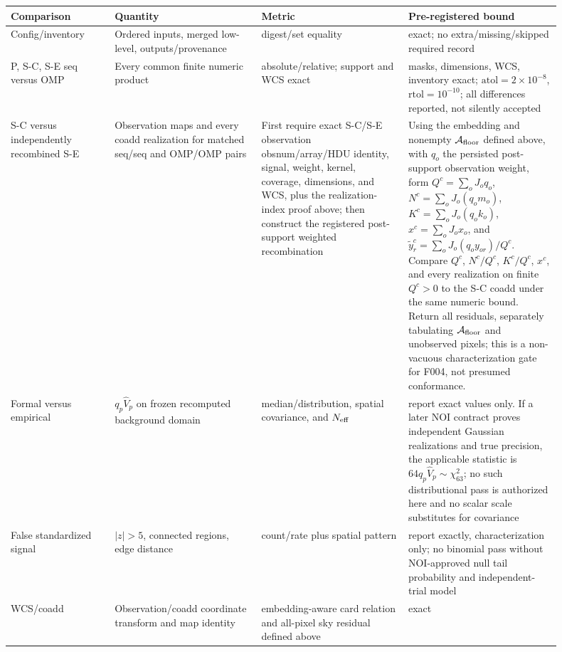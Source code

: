 \documentclass[11pt]{article}
\begin{document}
\begin{longtable}{L{0.17\linewidth}L{0.24\linewidth}L{0.24\linewidth}L{0.25\linewidth}}
\toprule
Comparison & Quantity & Metric & Pre-registered bound\\
\midrule
Config/inventory & Ordered inputs, merged low-level, outputs/provenance &
digest/set equality & exact; no extra/missing/skipped required record\\
P, S-C, S-E seq versus OMP & Every common finite numeric product &
absolute/relative; support and WCS exact & masks, dimensions, WCS, inventory
exact;
\(\mathrm{atol}=2\times10^{-8}\), \(\mathrm{rtol}=10^{-10}\); all differences
reported, not silently accepted\\
S-C versus independently recombined S-E & Observation maps and every coadd
realization for matched seq/seq and OMP/OMP pairs & First require exact
S-C/S-E observation obsnum/array/HDU identity, signal, weight, kernel,
coverage, dimensions, and WCS, plus the realization-index proof above; then
construct the registered post-support weighted recombination & Using the
embedding and nonempty \(\mathcal A_{\rm floor}\) defined above, with
\(q_o\) the persisted post-support observation weight, form
\(Q^c=\sum_oJ_oq_o\), \(N^c=\sum_oJ_o(q_om_o)\),
\(K^c=\sum_oJ_o(q_ok_o)\), \(x^c=\sum_oJ_ox_o\), and
\(\widetilde y_r^c=\sum_oJ_o(q_oy_{or})/Q^c\).  Compare \(Q^c\),
\(N^c/Q^c\), \(K^c/Q^c\), \(x^c\), and every realization on finite
\(Q^c>0\) to the S-C coadd under the same numeric bound.  Return all residuals,
separately tabulating \(\mathcal A_{\rm floor}\) and unobserved pixels; this is a
non-vacuous characterization gate for F004, not presumed conformance.\\
Formal versus empirical & \(q_p\widehat V_p\) on frozen recomputed background
domain & median/distribution, spatial covariance, and \(N_{\rm eff}\) & report
exact values only.  If a later NOI contract proves independent Gaussian
realizations and true precision, the applicable statistic is
\(64q_p\widehat V_p\sim\chi^2_{63}\); no such distributional pass is authorized
here and no scalar scale substitutes for covariance\\
False standardized signal & \(|z|>5\), connected regions, edge distance &
count/rate plus spatial pattern & report exactly, characterization only; no
binomial pass without NOI-approved null tail probability and independent-trial
model\\
WCS/coadd & Observation/coadd coordinate transform and map identity &
embedding-aware card relation and all-pixel sky residual defined above & exact

\end{longtable}
\end{document}
